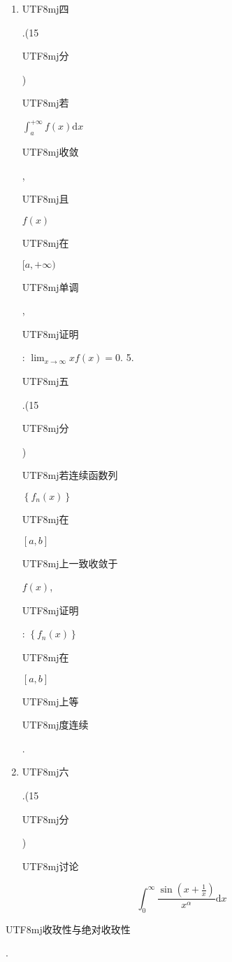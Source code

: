 \documentclass[10pt]{article}
\begin{document}
\begin{enumerate}
  \item \begin{CJK}{UTF8}{mj}四\end{CJK}.(15 \begin{CJK}{UTF8}{mj}分\end{CJK}) \begin{CJK}{UTF8}{mj}若\end{CJK} $\int_{a}^{+\infty} f(x) \mathrm{d} x$ \begin{CJK}{UTF8}{mj}收敛\end{CJK}, \begin{CJK}{UTF8}{mj}且\end{CJK} $f(x)$ \begin{CJK}{UTF8}{mj}在\end{CJK} $[a,+\infty)$ \begin{CJK}{UTF8}{mj}单调\end{CJK}, \begin{CJK}{UTF8}{mj}证明\end{CJK}: $\lim _{x \rightarrow \infty} x f(x)=0$. 5. \begin{CJK}{UTF8}{mj}五\end{CJK}.(15 \begin{CJK}{UTF8}{mj}分\end{CJK}) \begin{CJK}{UTF8}{mj}若连续函数列\end{CJK} $\left\{f_{n}(x)\right\}$ \begin{CJK}{UTF8}{mj}在\end{CJK} $[a, b]$ \begin{CJK}{UTF8}{mj}上一致收敛于\end{CJK} $f(x)$, \begin{CJK}{UTF8}{mj}证明\end{CJK}: $\left\{f_{n}(x)\right\}$ \begin{CJK}{UTF8}{mj}在\end{CJK} $[a, b]$ \begin{CJK}{UTF8}{mj}上等\end{CJK} \begin{CJK}{UTF8}{mj}度连续\end{CJK}.

  \item \begin{CJK}{UTF8}{mj}六\end{CJK}.(15 \begin{CJK}{UTF8}{mj}分\end{CJK}) \begin{CJK}{UTF8}{mj}讨论\end{CJK}

\end{enumerate}
$$
\int_{0}^{\infty} \frac{\sin \left(x+\frac{1}{x}\right)}{x^{\alpha}} \mathrm{d} x
$$
\begin{CJK}{UTF8}{mj}收玫性与绝对收玫性\end{CJK}.
\end{document}
